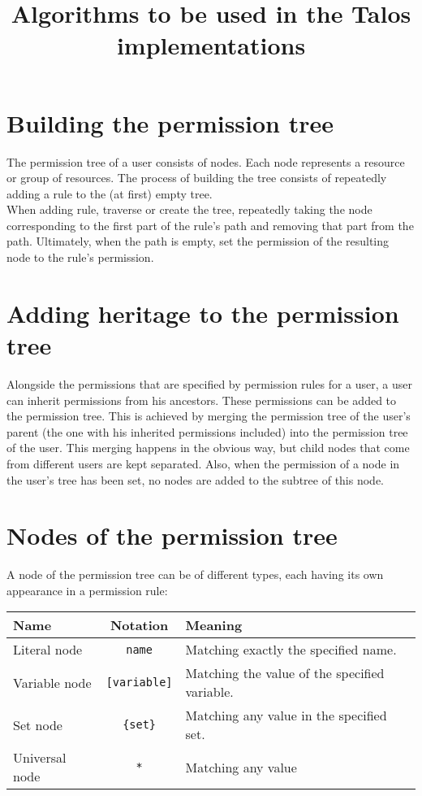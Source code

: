 \documentclass{article}
\title{Algorithms to be used in the Talos implementations}
\begin{document}
	\maketitle

	\section{Building the permission tree}
	The permission tree of a user consists of nodes. Each node represents a resource or group of resources. The process of building the tree consists of repeatedly adding a rule to the (at first) empty tree.\\
	When adding rule, traverse or create the tree, repeatedly taking the node corresponding to the first part of the rule's path and removing that part from the path. Ultimately, when the path is empty, set the permission of the resulting node to the rule's permission.
	
	\section{Adding heritage to the permission tree}
	Alongside the permissions that are specified by permission rules for a user, a user can inherit permissions from his ancestors. These permissions can be added to the permission tree. This is achieved by merging the permission tree of the user's parent (the one with his inherited permissions included) into the permission tree of the user. This merging happens in the obvious way, but child nodes that come from different users are kept separated. Also, when the permission of a node in the user's tree has been set, no nodes are added to the subtree of this node.

	\section{Nodes of the permission tree}
	A node of the permission tree can be of different types, each having its own appearance in a permission rule:\\
	\begin{tabular}{l|c|l}
		\textbf{Name} & \textbf{Notation} & \textbf{Meaning} \\\hline
		Literal node & \texttt{name} & Matching exactly the specified name. \\\hline
		Variable node & \texttt{[variable]} & Matching the value of the specified variable. \\\hline
		Set node & \texttt{\{set\}} & Matching any value in the specified set. \\\hline
		Universal node & \texttt{*} & Matching any value
	\end{tabular}
\end{document}
